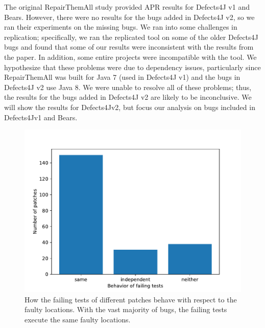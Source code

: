 \documentclass[10pt,journal,compsoc]{IEEEtran}
\begin{document}
The original RepairThemAll study provided APR results for Defects4J v1 and Bears. 
However, there were no results for the bugs added in Defects4J v2, so we ran their experiments on the missing bugs. 
We ran into some challenges in replication; specifically, we ran the replicated tool on some of the older Defects4J bugs and found that some of our results were inconsistent with the results from the paper. 
In addition, some entire projects were incompatible with the tool.
We hypothesize that these problems were due to dependency issues, particularly since RepairThemAll was built for Java 7 (used in Defects4J v1) and the bugs in Defects4J v2 use Java 8.
We were unable to resolve all of these problems; thus, the results for the bugs added in Defects4J v2 are likely to be inconclusive. 
We will show the results for Defects4Jv2, but focus our analysis on bugs included in Defects4Jv1 and Bears.

\begin{figure}
  \includegraphics[width=\linewidth]{img/coverage_faulty.pdf}
  \caption{\small How the failing tests of different patches behave with respect to the faulty locations. With the vast majority of bugs, the failing tests execute the same faulty locations.}
  \label{fig:coverage-faulty}
\end{figure}
\end{document}
